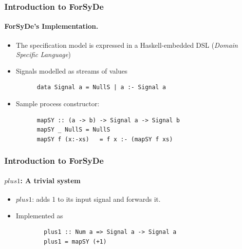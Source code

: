 \documentclass{beamer}
\begin{document}
\beamerdefaultoverlayspecification{<+->}

\begin{frame}[fragile]
  \frametitle{Introduction to ForSyDe}
  \framesubtitle{ForSyDe's Implementation.}

  \begin{itemize}
  \item The specification model is expressed in a Haskell-embedded 
    DSL (\textit{Domain Specific Language})
  \pause
  \item Signals modelled as streams of values
    \begin{lstlisting}
      data Signal a = NullS | a :- Signal a
    \end{lstlisting}
  \pause
  \item Sample process constructor: 
    \hspace{.3cm}
    \begin{lstlisting}
      mapSY :: (a -> b) -> Signal a -> Signal b
      mapSY _ NullS	= NullS
      mapSY f (x:-xs)	= f x :- (mapSY f xs)
    \end{lstlisting}

  \end{itemize}
\end{frame}



\begin{frame}[fragile]
  \frametitle{Introduction to ForSyDe}
  \framesubtitle{$\mathit{plus1}$: A trivial system}
  \begin{itemize}
    \item $\mathit{plus1}$:  adds 1 to its input signal and forwards it.
      \pause
      \item Implemented as
      \begin{lstlisting}
        plus1 :: Num a => Signal a -> Signal a
        plus1 = mapSY (+1)
      \end{lstlisting}
  \end{itemize}
\end{frame}
\end{document}
